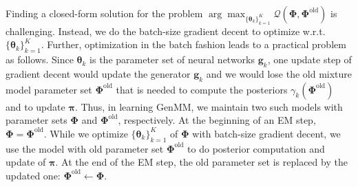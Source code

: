 
Finding a closed-form solution for the problem $\arg \max_{\{\bm{\theta}_k\}_{k=1}^{K}} \mathcal{Q} (\bm{\Phi},\bm{\Phi}^{\mathrm{old}})$ is challenging. Instead, we do the batch-size gradient decent to optimize w.r.t. $\{\bm{\theta}_k\}_{k=1}^{K}$.
Further, optimization in the batch fashion leads to a practical problem as follows. 
Since $\bm{\theta}_k$ is the parameter set of neural networks $\bm{g}_k$, one update step of gradient decent would update the generator $\bm{g}_k$ and we would lose the old mixture model parameter set $\bm{\Phi}^{\mathrm{old}}$ that is needed to compute the posteriors $\gamma_k(\bm{\Phi}^{\mathrm{old}})$ and to update $\bm{\pi}$. Thus, in learning GenMM, we maintain two such models with parameter sets $\bm{\Phi}$ and $\bm{\Phi}^{\mathrm{old}}$, respectively. At the beginning of an EM step, $\bm{\Phi} = \bm{\Phi}^{\mathrm{old}}$. While we optimize $\{\bm{\theta}_k\}_{k=1}^{K}$ of $\bm{\Phi}$ with batch-size gradient decent, we use the model with old parameter set $\bm{\Phi}^{\mathrm{old}}$ to do posterior computation and update of $\bm{\pi}$. At the end of the EM step, the old parameter set is replaced by the updated one: $\bm{\Phi}^{\mathrm{old}}\gets \bm{\Phi}$.



